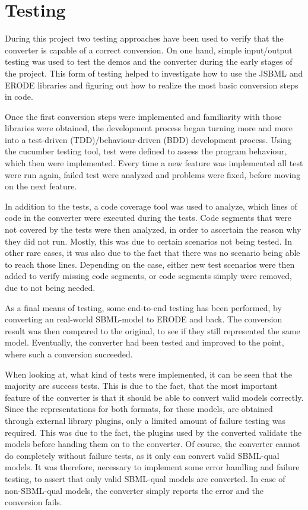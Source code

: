 \chapter{Testing}
During this project two testing approaches have been used to verify that the converter is capable of a correct conversion. On one hand, simple input/output testing was used to test the demos and the converter during the early stages of the project. This form of testing helped to investigate how to use the JSBML and ERODE libraries and figuring out how to realize the most basic conversion steps in code.

Once the first conversion steps were implemented and familiarity with those libraries were obtained, the development process began turning more and more into a test-driven (TDD)/behaviour-driven (BDD) development process. Using the cucumber testing tool, test were defined to assess the program behaviour, which then were implemented. Every time a new feature was implemented all test were run again, failed test were analyzed and problems were fixed, before moving on the next feature.

In addition to the tests, a code coverage tool was used to analyze, which lines of code in the converter were executed during the tests. Code segments that were not covered by the tests were then analyzed, in order to ascertain the reason why they did not run. Mostly, this was due to certain scenarios not being tested. In other rare cases, it was also due to the fact that there was no scenario being able to reach those lines. Depending on the case, either new test scenarios were then added to verify missing code segments, or code segments simply were removed, due to not being needed.

As a final means of testing, some end-to-end testing has been performed, by converting an real-world SBML-model to ERODE and back. The conversion result was then compared to the original, to see if they still represented the same model. Eventually, the converter had been tested and improved to the point, where such a conversion succeeded.

When looking at, what kind of tests were implemented, it can be seen that the majority are success tests. This is due to the fact, that the most important feature of the converter is that it should be able to convert valid models correctly. Since the representations for both formats, for these models, are obtained through external library plugins, only a limited amount of failure testing was required. This was due to the fact, the plugins used by the converted validate the models before handing them on to the converter. Of course, the converter cannot do completely without failure tests, as it only can convert valid SBML-qual models. It was therefore, necessary to implement some error handling and failure testing, to assert that only valid SBML-qual models are converted. In case of non-SBML-qual models, the converter simply reports the error and the conversion fails.

